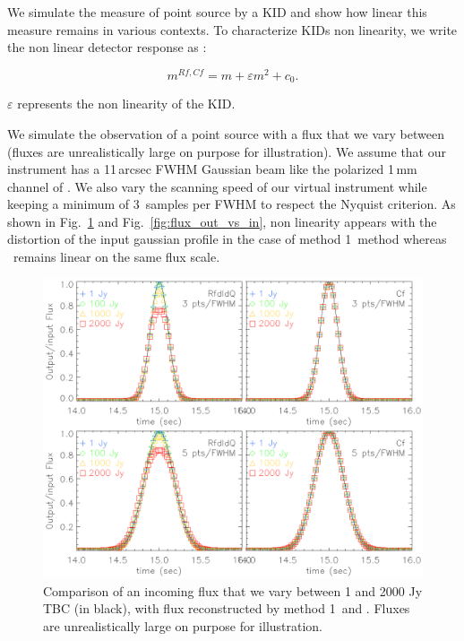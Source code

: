 We simulate the measure of point source by a KID and show how linear this measure remains in various contexts. To characterize KIDs non linearity, we write the non linear detector response as :

\begin{equation}
m^{Rf,Cf} = m + \varepsilon m^2 +c_{0}.
\label{eq:model_kid_nl}
\end{equation}

$\varepsilon$ represents the non linearity of the KID.

We simulate the observation of a point source with a flux
that we vary between  (fluxes are unrealistically large on purpose for illustration). We assume that our instrument has
a 11\,arcsec FWHM Gaussian beam like the polarized 1\,mm channel of \nikad. We
also vary the scanning speed of our virtual instrument while keeping a minimum
of 3~samples per FWHM to respect the Nyquist criterion.
As shown in Fig.~\ref{fig:planet_profiles} and Fig.~\ref{fig:flux_out_vs_in}, non linearity appears with the distortion of the input gaussian profile in the case of method 1\ method whereas \cf\ remains linear on the same flux scale.

\begin{figure}
  \includegraphics[clip, angle=0, width=\columnwidth]{Figures/planet_profiles.eps}
  \caption{Comparison of an incoming flux that we vary between 1 and 2000 Jy TBC (in black), with flux reconstructed by method 1\ and \cf. Fluxes are unrealistically large on purpose for illustration. }
  \label{fig:planet_profiles}
\end{figure}


